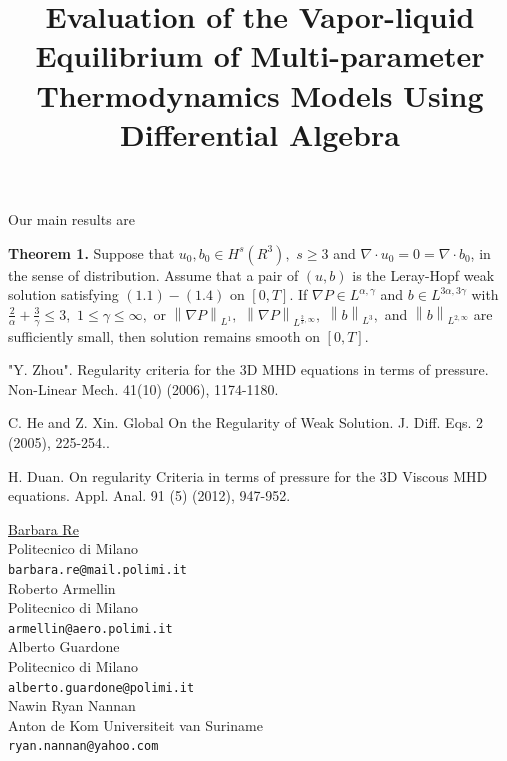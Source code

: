 \documentclass[article, A4, 11pt]{llncs}%
\begin{document}
Our main results are

\textbf{Theorem 1.} Suppose  that $u_{0},b_{0}\in H^{s}(R^{3}),$ $s\geq 3$ and $\nabla \cdot u_{0}=0=\nabla \cdot b_{0}$, in the sense of distribution. Assume that a pair of $(u,b)$ is the Leray-Hopf weak solution satisfying $(1.1)-(1.4)$ on $[0,T].$ If $ \nabla P\in L^{\alpha, \gamma}$ and $b\in L^{3\alpha, 3\gamma}$ with $\frac {2} {\alpha}+\frac {3}{\gamma}\leq 3,$
$1\leq \gamma\leq\infty,$ or $\left\|\nabla P\right\|_{L^ {1}},$ $\left\|\nabla P\right\|_{L^ {\frac{2}{3},\infty}},$ $\left\|b\right\|_{L^ {3}},$ and $\left\|b\right\|_{L^ {2,\infty}}$ are sufficiently small, then solution remains smooth on $[0,T].$



\begin{thebibliography}{10}
{\sc "Y. Zhou"}. { Regularity criteria for the 3D MHD equations in terms of pressure}. Non-Linear Mech. 41(10) (2006), 1174-1180.

{\sc C. He and Z. Xin}. {Global On the Regularity of Weak Solution}. J. Diff. Eqs. 2 (2005), 225-254..

{\sc H. Duan}. {On regularity Criteria in terms of pressure for the 3D Viscous MHD equations}. Appl. Anal. 91 (5) (2012), 947-952.
\end{thebibliography} %

\title{Evaluation of the Vapor-liquid Equilibrium of Multi-parameter Thermodynamics Models Using Differential Algebra}
 \author{} \institute{}
\maketitle
\begin{center}
{\large \underline{Barbara Re}}\\
Politecnico di Milano\\
{\tt barbara.re@mail.polimi.it}
\\ \vspace{4mm}
{\large Roberto Armellin}\\
Politecnico di Milano\\
{\tt armellin@aero.polimi.it}
\\ \vspace{4mm}
{\large Alberto Guardone}\\
Politecnico di Milano\\
{\tt alberto.guardone@polimi.it}
\\ \vspace{4mm}
{\large Nawin Ryan Nannan}\\
Anton de Kom Universiteit van Suriname\\
{\tt ryan.nannan@yahoo.com}
\end{center}
\end{document}
